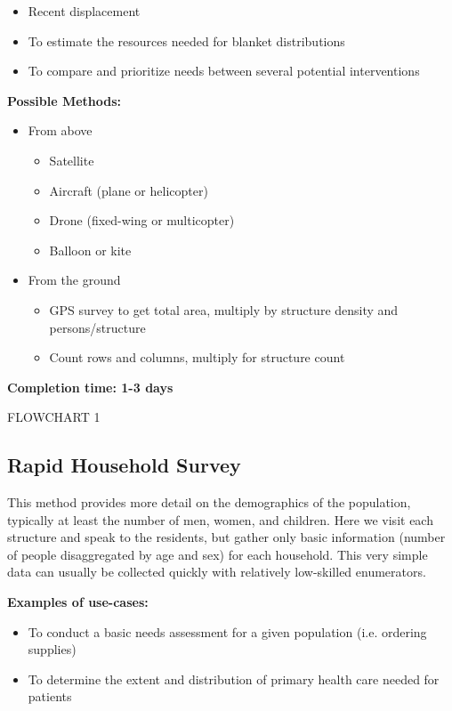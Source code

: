 \documentclass[a4paper,12pt,twoside]{article}
\begin{document}
\begin{itemize}
  \item Recent displacement
  \item To estimate the resources needed for blanket distributions
  \item To compare and prioritize needs between several potential interventions
\end{itemize}

\noindent
\textbf{Possible Methods:}

\begin{itemize}
  \item From above
  \begin{itemize}
    \item Satellite
    \item Aircraft (plane or helicopter)
    \item Drone (fixed-wing or multicopter)
    \item Balloon or kite
  \end{itemize}
\end{itemize}

\begin{itemize}
  \item From the ground
  \begin{itemize}
    \item GPS survey to get total area, multiply by structure density and persons/structure
    \item Count rows and columns, multiply for structure count
  \end{itemize}
\end{itemize}

\noindent
\textbf{Completion time: 1-3 days}

FLOWCHART 1

\subsection{Rapid Household Survey}
This method provides more detail on the demographics of the population, typically at least the number of men, women, and children. Here we visit each structure and speak to the residents, but gather only basic information (number of people disaggregated by age and sex) for each household. This very simple data can usually be collected quickly with relatively low-skilled enumerators.

\noindent
\textbf{Examples of use-cases:}

\begin{itemize}
    \item To conduct a basic needs assessment for a given population (i.e. ordering supplies)
    \item To determine the extent and distribution of primary health care needed for patients
\end{itemize}
\end{document}
